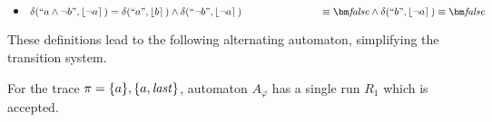 \begin{example}
\begin{itemize}
        \item $\delta(``a \wedge \neg b",\interp{ \neg a })=
        \delta(``a",\interp{ b }) \wedge \delta(``\neg b",\interp{ \neg a })\\
        \phantom{\delta(``a \wedge \neg b",\interp{ \neg a })} \equiv \fpbf \wedge \delta(``b",\interp{ \neg a })  \equiv \fpbf$      
    \end{itemize}

    These definitions lead to the following alternating automaton, simplifying the transition system.

    


    For the trace $\pi=\{a\},\{a,\mathit{last}\}$, automaton $A_{\varphi}$ has a single run $R_1$ which is accepted.

    
    

\end{example}

